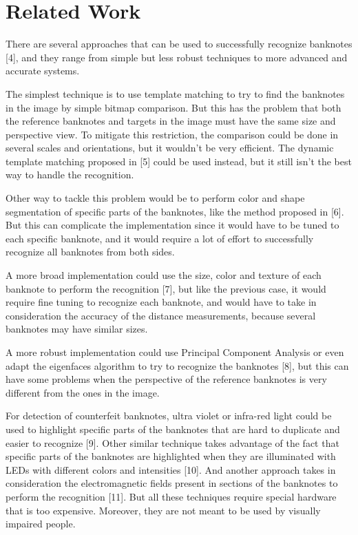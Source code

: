 \section{Related Work}\label{sec:related-work}

There are several approaches that can be used to successfully recognize banknotes [4], and they range from simple but less robust techniques to more advanced and accurate systems.

The simplest technique is to use template matching to try to find the banknotes in the image by simple bitmap comparison. But this has the problem that both the reference banknotes and targets in the image must have the same size and perspective view. To mitigate this restriction, the comparison could be done in several scales and orientations, but it wouldn't be very efficient. The dynamic template matching proposed in [5] could be used instead, but it still isn't the best way to handle the recognition.

Other way to tackle this problem would be to perform color and shape segmentation of specific parts of the banknotes, like the method proposed in [6]. But this can complicate the implementation since it would have to be tuned to each specific banknote, and it would require a lot of effort to successfully recognize all banknotes from both sides.

A more broad implementation could use the size, color and texture of each banknote to perform the recognition [7], but like the previous case, it would require fine tuning to recognize each banknote, and would have to take in consideration the accuracy of the distance measurements, because several banknotes may have similar sizes.

A more robust implementation could use Principal Component Analysis or even adapt the eigenfaces algorithm to try to recognize the banknotes [8], but this can have some problems when the perspective of the reference banknotes is very different from the ones in the image.

For detection of counterfeit banknotes, ultra violet or infra-red light could be used to highlight specific parts of the banknotes that are hard to duplicate and easier to recognize [9]. Other similar technique takes advantage of the fact that specific parts of the banknotes are highlighted when they are illuminated with LEDs with different colors and intensities [10]. And another approach takes in consideration the electromagnetic fields present in sections of the banknotes to perform the recognition [11]. But all these techniques require special hardware that is too expensive. Moreover, they are not meant to be used by visually impaired people.


